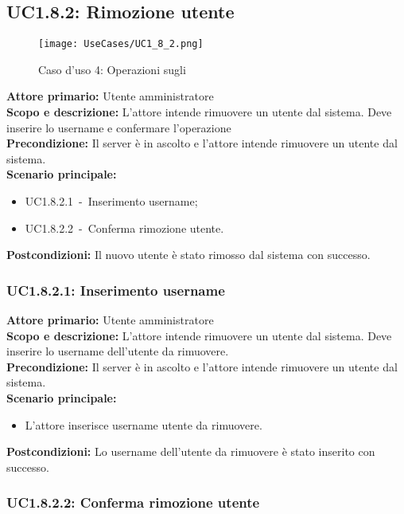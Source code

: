 \documentclass{scalatekids-article}
\begin{document}
\subsection{UC1.8.2: Rimozione utente}

\begin{figure}[H]
  \begin{center}
    \texttt{[image: UseCases/UC1\_8\_2.png]}
    \caption*{Caso d'uso 4: Operazioni sugli }
  \end{center}
\end{figure}
\textbf{Attore primario:} Utente amministratore\\
\textbf{Scopo e descrizione:} L'attore intende rimuovere un utente dal sistema. Deve inserire lo username e confermare l'operazione\\
\textbf{Precondizione:} Il server è in ascolto e l'attore intende rimuovere un utente dal sistema.\\
\textbf{Scenario principale:}
\begin{itemize}
\item UC1.8.2.1\ -\ Inserimento username;
\item UC1.8.2.2\ -\ Conferma rimozione utente.
\end{itemize}
\textbf{Postcondizioni:} Il nuovo utente è stato rimosso dal sistema con successo.

\subsubsection{UC1.8.2.1: Inserimento username}

\textbf{Attore primario:} Utente amministratore\\
\textbf{Scopo e descrizione:} L'attore intende rimuovere un utente dal sistema. Deve inserire lo username dell'utente da rimuovere.\\
\textbf{Precondizione:} Il server è in ascolto e l'attore intende rimuovere un utente dal sistema.\\
\textbf{Scenario principale:}
\begin{itemize}
\item L'attore inserisce username utente da rimuovere.
\end{itemize}
\textbf{Postcondizioni:} Lo username dell'utente da rimuovere è stato inserito con successo.

\subsubsection{UC1.8.2.2: Conferma rimozione utente}
\end{document}
